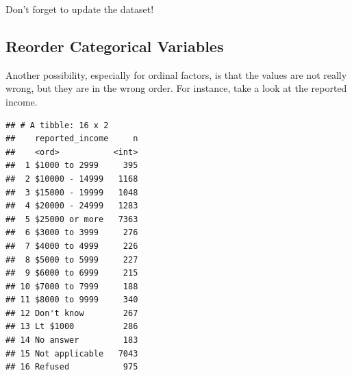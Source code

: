 \documentclass[]{tufte-book}
\newenvironment{Shaded}{}{}
\newcommand{\KeywordTok}[1]{\textcolor[rgb]{0.00,0.44,0.13}{\textbf{#1}}}
\newcommand{\DataTypeTok}[1]{\textcolor[rgb]{0.56,0.13,0.00}{#1}}
\newcommand{\StringTok}[1]{\textcolor[rgb]{0.25,0.44,0.63}{#1}}
\newcommand{\OperatorTok}[1]{\textcolor[rgb]{0.40,0.40,0.40}{#1}}
\newcommand{\NormalTok}[1]{#1}
\begin{document}
\begin{Shaded}
\end{Shaded}

Don't forget to update the dataset!

\subsection{Reorder Categorical
Variables}\label{reorder-categorical-variables}

Another possibility, especially for ordinal factors, is that the values
are not really wrong, but they are in the wrong order. For instance,
take a look at the reported income.

\begin{Shaded}
\end{Shaded}

\begin{verbatim}
## # A tibble: 16 x 2
##    reported_income     n
##    <ord>           <int>
##  1 $1000 to 2999     395
##  2 $10000 - 14999   1168
##  3 $15000 - 19999   1048
##  4 $20000 - 24999   1283
##  5 $25000 or more   7363
##  6 $3000 to 3999     276
##  7 $4000 to 4999     226
##  8 $5000 to 5999     227
##  9 $6000 to 6999     215
## 10 $7000 to 7999     188
## 11 $8000 to 9999     340
## 12 Don't know        267
## 13 Lt $1000          286
## 14 No answer         183
## 15 Not applicable   7043
## 16 Refused           975
\end{verbatim}
\end{document}
